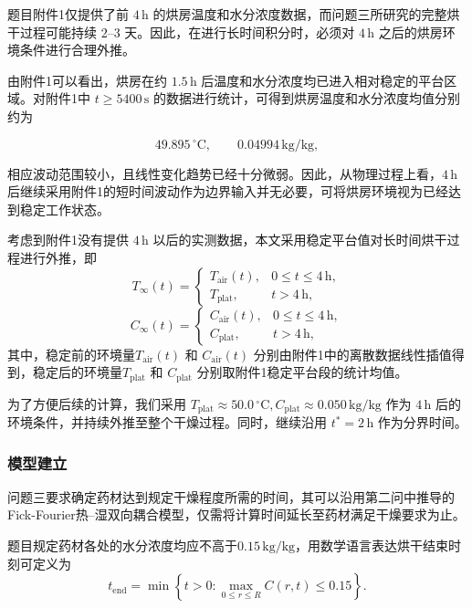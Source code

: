 \documentclass[12pt,a4paper]{article}
\begin{document}
题目附件1仅提供了前 $4\,\mathrm{h}$ 的烘房温度和水分浓度数据，而问题三所研究的完整烘干过程可能持续 $2$--$3$ 天。因此，在进行长时间积分时，必须对 $4\,\mathrm{h}$ 之后的烘房环境条件进行合理外推。

由附件1可以看出，烘房在约 $1.5\,\mathrm{h}$ 后温度和水分浓度均已进入相对稳定的平台区域。对附件1中 $t\geq5400\,\mathrm{s}$ 的数据进行统计，可得到烘房温度和水分浓度均值分别约为

$$
49.895\,^\circ\mathrm{C},
\qquad
0.04994\,\mathrm{kg/kg},
$$

相应波动范围较小，且线性变化趋势已经十分微弱。因此，从物理过程上看，$4\,\mathrm{h}$ 后继续采用附件1的短时间波动作为边界输入并无必要，可将烘房环境视为已经达到稳定工作状态。

考虑到附件1没有提供 $4\,\mathrm{h}$ 以后的实测数据，本文采用稳定平台值对长时间烘干过程进行外推，即
\begin{equation}
T_\infty(t)=
\begin{cases}
T_{\mathrm{air}}(t), & 0\leq t\leq 4\,\mathrm{h},\\
T_{\mathrm{plat}}, & t>4\,\mathrm{h},
\end{cases}
\label{eq:Tenv3}
\end{equation}
\begin{equation}
C_\infty(t)=
\begin{cases}
C_{\mathrm{air}}(t), & 0\leq t\leq 4\,\mathrm{h},\\
C_{\mathrm{plat}}, & t>4\,\mathrm{h},
\end{cases}
\label{eq:Cenv3}
\end{equation}
其中，稳定前的环境量$T_{\mathrm{air}}(t)$ 和 $C_{\mathrm{air}}(t)$ 分别由附件1中的离散数据线性插值得到，稳定后的环境量$T_{\mathrm{plat}}$ 和 $C_{\mathrm{plat}}$ 分别取附件1稳定平台段的统计均值。

为了方便后续的计算，我们采用
$
T_{\mathrm{plat}}\approx50.0\,^\circ\mathrm{C},
C_{\mathrm{plat}}\approx0.050\,\mathrm{kg/kg}
$
作为 $4\,\mathrm{h}$ 后的环境条件，并持续外推至整个干燥过程。同时，继续沿用 $t^*=2\,\mathrm{h}$ 作为分界时间。



\subsubsection{模型建立}

问题三要求确定药材达到规定干燥程度所需的时间，其可以沿用第二问中推导的Fick-Fourier热–湿双向耦合模型，仅需将计算时间延长至药材满足干燥要求为止。

题目规定药材各处的水分浓度均应不高于$0.15\,\mathrm{kg/kg}$，用数学语言表达烘干结束时刻可定义为
\begin{equation}
t_{\mathrm{end}}
=
\min
\left\{
t>0:
\max_{0\leq r\leq R}C(r,t)
\leq 0.15
\right\}.
\label{eq:endtime3}
\end{equation}
\end{document}
